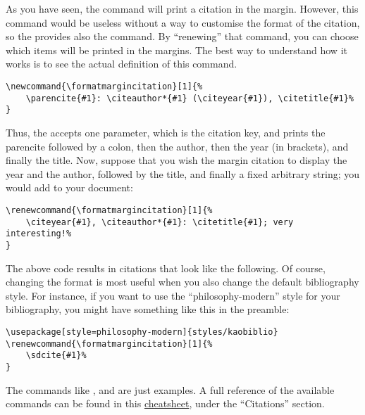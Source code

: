 As you have seen, the  command will print a citation 
in the margin. However, this command would be useless without a way to 
customise the format of the citation, so the  provides 
also the  command. By \enquote{renewing} 
that command, you can choose which items will be printed in the margins. 
The best way to understand how it works is to see the actual definition 
of this command.

\begin{lstlisting}[style=kaolstplain,linewidth=1.5\textwidth]
\newcommand{\formatmargincitation}[1]{%
	\parencite{#1}: \citeauthor*{#1} (\citeyear{#1}), \citetitle{#1}%
}
\end{lstlisting}

Thus, the  accepts one parameter, which is 
the citation key, and prints the parencite followed by a colon, then the 
author, then the year (in brackets), and finally the 
title. Now, suppose that you wish the margin 
citation to display the year and the author, followed by the title, and 
finally a fixed arbitrary string; you would add to your document:

\begin{lstlisting}[style=kaolstplain,linewidth=1.5\textwidth]
\renewcommand{\formatmargincitation}[1]{%
	\citeyear{#1}, \citeauthor*{#1}: \citetitle{#1}; very interesting!%
}
\end{lstlisting}

\renewcommand{\formatmargincitation}[1]{%
	\citeyear{#1}, \citeauthor*{#1}: \citetitle{#1}; very interesting!%
}

The above code results in citations that look like the 
following. Of course, changing the format is most 
useful when you also change the default bibliography style. For 
instance, if you want to use the \enquote{philosophy-modern} style for 
your bibliography, you might have something like this in the preamble:

\begin{lstlisting}[style=kaolstplain,linewidth=1.5\textwidth]
\usepackage[style=philosophy-modern]{styles/kaobiblio}
\renewcommand{\formatmargincitation}[1]{%
	\sdcite{#1}%
}

\end{lstlisting}

\renewcommand{\formatmargincitation}[1]{%
	\parencite{#1}: \citeauthor*{#1} (\citeyear{#1}), \citetitle{#1}%
}

The commands like , 
and  are just examples. A full
reference of the available commands can be found in this
\href{http://tug.ctan.org/info/biblatex-cheatsheet/biblatex-cheatsheet.pdf}{cheatsheet},
under the \enquote{Citations} section.

